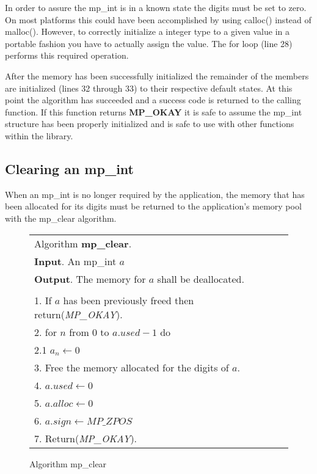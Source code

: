\documentclass[b5paper]{book}
\begin{document}
In order to assure the mp\_int is in a known state the digits must be set to zero.  On most platforms this could have been
accomplished by using calloc() instead of malloc().  However,  to correctly initialize a integer type to a given value in a 
portable fashion you have to actually assign the value.  The for loop (line 28) performs this required
operation.

After the memory has been successfully initialized the remainder of the members are initialized 
(lines 32 through 33) to their respective default states.  At this point the algorithm has succeeded and
a success code is returned to the calling function.  If this function returns \textbf{MP\_OKAY} it is safe to assume the 
mp\_int structure has been properly initialized and is safe to use with other functions within the library.  

\subsection{Clearing an mp\_int}
When an mp\_int is no longer required by the application, the memory that has been allocated for its digits must be 
returned to the application's memory pool with the mp\_clear algorithm.

\begin{figure}[here]
\begin{center}
\begin{tabular}{l}
\hline Algorithm \textbf{mp\_clear}. \\
\textbf{Input}.   An mp\_int $a$ \\
\textbf{Output}.  The memory for $a$ shall be deallocated.  \\
\hline \\
1.  If $a$ has been previously freed then return(\textit{MP\_OKAY}). \\
2.  for $n$ from 0 to $a.used - 1$ do \\
\hspace{3mm}2.1  $a_n \leftarrow 0$ \\
3.  Free the memory allocated for the digits of $a$. \\
4.  $a.used \leftarrow 0$ \\
5.  $a.alloc \leftarrow 0$ \\
6.  $a.sign \leftarrow MP\_ZPOS$ \\
7.  Return(\textit{MP\_OKAY}). \\
\hline
\end{tabular}
\end{center}
\caption{Algorithm mp\_clear}
\end{figure}
\end{document}
